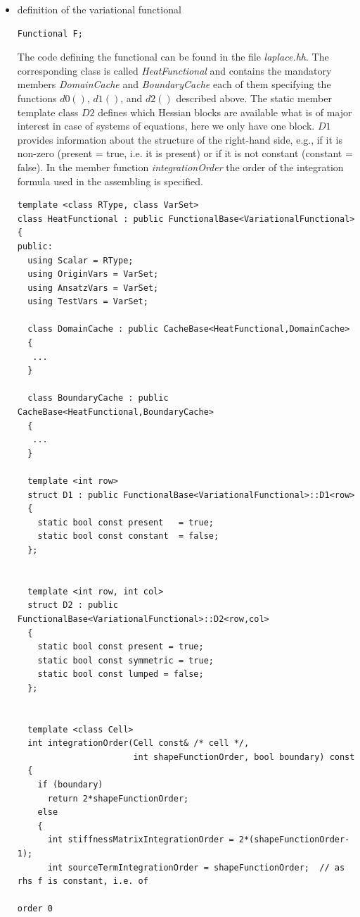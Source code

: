 \documentclass[11pt]{article}
\begin{document}
\begin{itemize}
\item definition of the variational functional
\begin{lstlisting}
Functional F;
\end{lstlisting}

The code defining the functional  can be found in the file {\em laplace.hh}.
The corresponding class is called {\em HeatFunctional} and contains the 
mandatory members {\em DomainCache} and {\em BoundaryCache} each of them specifying
the functions $d0()$, $d1()$, and $d2()$ described above. 
The static member template class $D2$ defines which Hessian blocks are available
what is of major interest in case of systems of equations, here we only have one block.
$D1$ provides information about the structure of the right-hand side, e.g., if
it is non-zero (present = true, i.e. it is present) or if it is not constant (constant = false).
In the member function {\em integrationOrder} the order of the integration formula used
in the assembling is specified.

\begin{lstlisting}
template <class RType, class VarSet>
class HeatFunctional : public FunctionalBase<VariationalFunctional>
{
public:
  using Scalar = RType;
  using OriginVars = VarSet;
  using AnsatzVars = VarSet;
  using TestVars = VarSet;

  class DomainCache : public CacheBase<HeatFunctional,DomainCache>
  {
   ...
  }

  class BoundaryCache : public CacheBase<HeatFunctional,BoundaryCache>
  {
   ...
  }

  template <int row>
  struct D1 : public FunctionalBase<VariationalFunctional>::D1<row>
  {
    static bool const present   = true;
    static bool const constant  = false;
  };
  

  template <int row, int col>
  struct D2 : public FunctionalBase<VariationalFunctional>::D2<row,col>
  {
    static bool const present = true;
    static bool const symmetric = true;
    static bool const lumped = false;
  };


  template <class Cell>
  int integrationOrder(Cell const& /* cell */,
                       int shapeFunctionOrder, bool boundary) const 
  {
    if (boundary) 
      return 2*shapeFunctionOrder;
    else
    {
      int stiffnessMatrixIntegrationOrder = 2*(shapeFunctionOrder-1);
      int sourceTermIntegrationOrder = shapeFunctionOrder;  // as rhs f is constant, i.e. of 
                                                                                     order 0


\end{lstlisting}
\end{itemize}
\end{document}
